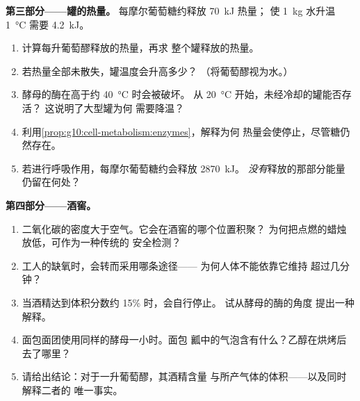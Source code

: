 \begin{problem}
\medskip
\noindent\textbf{第三部分——罐的热量。}
每摩尔葡萄糖约释放 \qty{70}{kJ} 热量；
使 \qty{1}{kg} 水升温 \qty{1}{\celsius} 需要 \qty{4.2}{kJ}。
\begin{enumerate}[resume]
  \item 计算每升葡萄醪释放的热量，再求
        整个罐释放的热量。
  \item 若热量全部未散失，罐温度会升高多少？
        （将葡萄醪视为水。）
  \item 酵母的酶在高于约 \qty{40}{\celsius} 时会被破坏。
        从 \qty{20}{\celsius} 开始，未经冷却的罐能否存活？
        这说明了大型罐为何
        需要降温？
  \item 利用\cref{prop:g10:cell-metabolism:enzymes}，解释为何
        热量会使停止，尽管糖仍然存在。
  \item 若进行呼吸作用，每摩尔葡萄糖约会释放 \qty{2870}{kJ}。
        \emph{没有}释放的那部分能量
        仍留在何处？
\end{enumerate}

\medskip
\noindent\textbf{第四部分——酒窖。}
\begin{enumerate}[resume]
  \item 二氧化碳的密度大于空气。它会在酒窖的哪个位置积聚？
        为何把点燃的蜡烛放低，可作为一种传统的
        安全检测？
  \item 工人的缺氧时，会转而采用哪条途径——
        为何人体不能依靠它维持
        超过几分钟？
  \item 当酒精达到体积分数约 15\% 时，会自行停止。
        试从酵母的酶的角度
        提出一种解释。
  \item 面包面团使用同样的酵母一小时。面包
        瓤中的气泡含有什么？乙醇在烘烤后
        去了哪里？
  \item 请给出结论：对于一升葡萄醪，其酒精含量
        与所产气体的体积——以及同时解释二者的
        唯一事实。
\end{enumerate}
\end{problem}
